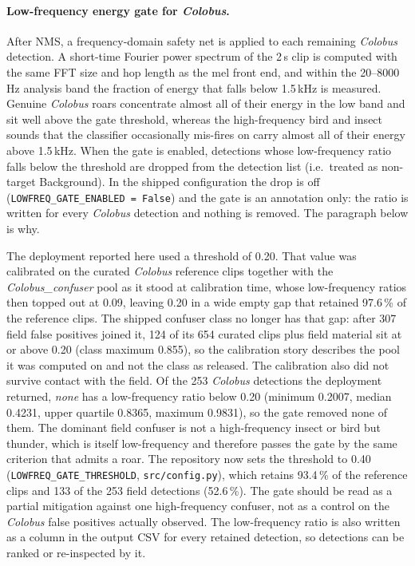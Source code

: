 \documentclass[review,3p,times]{elsarticle}
\begin{document}
\paragraph{Low-frequency energy gate for \textit{Colobus}.}
After NMS, a frequency-domain safety net is applied to each remaining
\textit{Colobus} detection. A short-time Fourier power spectrum of the 2\,s
clip is computed with the same FFT size and hop length as the mel front end,
and within the 20--8000\,Hz analysis band the fraction of energy that falls
below 1.5\,kHz is measured. Genuine \textit{Colobus} roars concentrate almost
all of their energy in the low band and sit well above the gate threshold,
whereas the high-frequency bird and insect sounds that the classifier
occasionally mis-fires on carry almost all of their energy above 1.5\,kHz.
When the gate is enabled, detections whose low-frequency ratio falls below the
threshold are dropped from the detection list (i.e.\ treated as non-target
Background). In the shipped configuration the drop is off
(\texttt{LOWFREQ\_GATE\_ENABLED = False}) and the gate is an annotation only:
the ratio is written for every \textit{Colobus} detection and nothing is
removed. The paragraph below is why.

The deployment reported here used a threshold of 0.20. That value was
calibrated on the curated \textit{Colobus} reference clips together with the
\textit{Colobus\_confuser} pool as it stood at calibration time, whose
low-frequency ratios then topped out at 0.09, leaving 0.20 in a wide empty
gap that retained 97.6\,\% of the reference clips. The shipped confuser class
no longer has that gap: after 307 field false positives joined it, 124 of its
654 curated clips plus field material sit at or above 0.20 (class maximum
0.855), so the calibration story describes the pool it was computed on and
not the class as released. The calibration also did not survive contact with
the field.
Of the 253 \textit{Colobus} detections the deployment returned, \emph{none}
has a low-frequency ratio below 0.20 (minimum 0.2007, median 0.4231, upper
quartile 0.8365, maximum 0.9831), so the gate removed none of them. The
dominant field confuser is not a high-frequency insect or bird but thunder,
which is itself low-frequency and therefore passes the gate by the same
criterion that admits a roar. The repository now sets the threshold to 0.40
(\texttt{LOWFREQ\_GATE\_THRESHOLD}, \texttt{src/config.py}), which retains
93.4\,\% of the reference clips and 133 of the 253 field detections
(52.6\,\%). The gate should be read as a partial mitigation against one
high-frequency confuser, not as a control on the \textit{Colobus} false
positives actually observed. The low-frequency ratio is also written as a column
in the output CSV for every retained detection, so detections can be ranked or
re-inspected by it.
\end{document}
